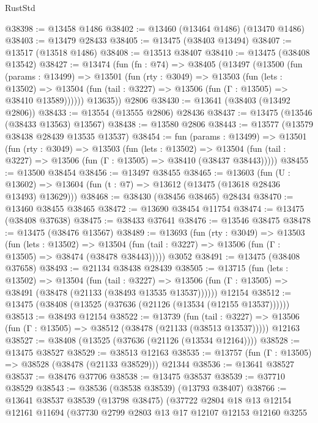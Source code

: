 \begin{lexlean}{RustStd}
\begin{coremodule}
@38398 := @13458 @1486
@38402 := @13460 (@13464 @1486) (@13470 @1486)
@38403 := @13479 @28433
@38405 := @13475 (@38403 @13494)
@38407 := @13517 (@13518 @1486)
@38408 := @13513 @38407
@38410 := @13475 (@38408 @13542)
@38427 := @13474
    (fun (fn : @74) =>
    @38405
      (@13497
        (@13500
          (fun (params : @13499) =>
          @13501
            (fun (rty : @3049) =>
            @13503
              (fun (lets : @13502) =>
              @13504 (fun (tail : @3227) => @13506 (fun (Γ : @13505) => @38410 @13589))))))
        @13635))
    @2806
@38430 := @13641 (@38403 (@13492 @2806))
@38433 := @13554 (@13555 @2806) @28436
@38437 := @13475 (@13546 (@38433 @13563) @13567)
@38438 := @13580 @2806
@38443 := @13577 (@13579 @38438 @28439 @13535 @13537)
@38454 := fun (params : @13499) =>
  @13501
    (fun (rty : @3049) =>
    @13503
      (fun (lets : @13502) =>
      @13504 (fun (tail : @3227) => @13506 (fun (Γ : @13505) => @38410 (@38437 @38443)))))
@38455 := @13500 @38454
@38456 := @13497 @38455
@38465 := @13603
    (fun (U : @13602) => @13604 (fun (t : @7) => @13612 (@13475 (@13618 @28436 @13493) @13629)))
@38468 := @38430 (@38456 @38465) @28434
@38470 := @13460 @38455 @38465
@38472 := @13690 @38454 @11754
@38474 := @13475 (@38408 @37638)
@38475 := @38433 @37641
@38476 := @13546 @38475
@38478 := @13475 (@38476 @13567)
@38489 := @13693
    (fun (rty : @3049) =>
    @13503
      (fun (lets : @13502) =>
      @13504 (fun (tail : @3227) => @13506 (fun (Γ : @13505) => @38474 (@38478 @38443)))))
    @3052
@38491 := @13475 (@38408 @37658)
@38493 := @21134 @38438 @28439
@38505 := @13715
    (fun (lets : @13502) =>
    @13504
      (fun (tail : @3227) =>
      @13506 (fun (Γ : @13505) => @38491 (@38478 (@21133 (@38493 @13535 @13537))))))
    @12154
@38512 := @13475 (@38408 (@13525 (@37636 (@21126 (@13534 (@12155 @13537))))))
@38513 := @38493 @12154
@38522 := @13739
    (fun (tail : @3227) => @13506 (fun (Γ : @13505) => @38512 (@38478 (@21133 (@38513 @13537)))))
    @12163
@38527 := @38408 (@13525 (@37636 (@21126 (@13534 @12164))))
@38528 := @13475 @38527
@38529 := @38513 @12163
@38535 := @13757 (fun (Γ : @13505) => @38528 (@38478 (@21133 @38529))) @21344
@38536 := @13641 @38527
@38537 := @38476 @37706
@38538 := @13475 @38537
@38539 := @37710 @38529
@38543 := @38536 (@38538 @38539) (@13793 @38407)
@38766 := @13641
    @38537
    @38539
    (@13798 @38475)
    (@37722
      @2804
      @18
      @13
      @12154
      @12161
      @11694
      (@37730
        @2799
        @2803
        @13
        @17
        @12107
        @12153
        @12160
        @3255

\end{coremodule}
\end{lexlean}
